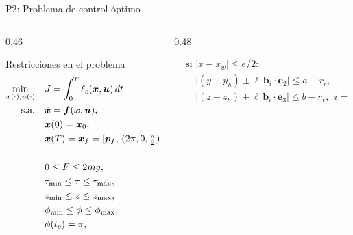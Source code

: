 \begin{frame}{P2: Problema de control óptimo}
\begin{columns}[T]
\begin{column}{0.46\textwidth}
\begin{tbox}{Restricciones en el problema}
\footnotesize
\begin{align*}
\min_{\bm{x}(\cdot),\bm{u}(\cdot)}\quad & J=\int_0^T \ell_c(\bm{x},\bm{u})\,dt\\
\text{s.a.}\quad & \dot{\bm{x}}=\bm f(\bm{x},\bm{u}),\\
& \bm{x}(0)=\bm{x}_0,\\
& \bm{x}(T)=\bm{x}_f=[\bm{p}_f,\,(2\pi,0,\tfrac{\pi}{2}),\,\mathbf 0],\\
& \\
& 0\le F\le 2mg,\\
& \tau_{\min}\le \tau\le \tau_{\max},\\
& z_{\min}\le z\le z_{\max},\\
& \phi_{\min}\le\phi\le\phi_{\max},\\
& \phi(t_c)=\pi,\\
\end{align*}
\vspace{-8mm}
\end{tbox}
\end{column}

\begin{column}{0.48\textwidth}
\begin{tbox}
\footnotesize
\vspace{-3mm}
\footnotesize
\begin{align*}
& \text{si }|x-x_w|\le e/2:\\
& \quad \big|(y-y_h)\pm\ell\,\bm b_i\!\cdot\!\mathbf e_2\big|\le a-r_r,\\
& \quad \big|(z-z_h)\pm\ell\,\bm b_i\!\cdot\!\mathbf e_3\big|\le b-r_r,\ \ i=1,2.
\end{align*}
\end{tbox}
\end{column}
\end{columns}
\end{frame}


